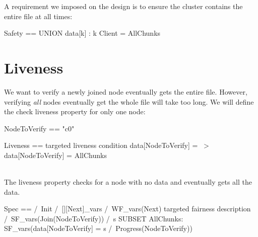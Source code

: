 A requirement we imposed on the design is to ensure the cluster contains the
entire file at all times:\\

\begin{tla}
Safety == 
    UNION {data[k] : k \in Client} = AllChunks
\end{tla}
\begin{tlatex}
%
\end{tlatex}

\section{Liveness}

We want to verify a newly joined node eventually gets the entire file. However, 
verifying \textit{all} nodes eventually get the whole file will take too long.
We will define the check liveness property for only one node:\\

\begin{tla}
NodeToVerify == "c0"

Liveness == 
    \* targeted liveness condition
    data[NodeToVerify] = {} ~> data[NodeToVerify] = AllChunks
\end{tla}
\begin{tlatex}
%
\@pvspace{8.0pt}%
%
%
%
\@xx{}%
\end{tlatex}
\\

The liveness property checks for a node with no data and eventually gets all the
data.\\

\begin{tla}
Spec ==
    /\ Init
    /\ [][Next]_vars
    /\ WF_vars(Next)
    \* targeted fairness description
    /\ SF_vars(Join(NodeToVerify))
    /\ \A s \in SUBSET AllChunks: 
        SF_vars(data[NodeToVerify] = s /\ Progress(NodeToVerify))   
\end{tla}
\begin{tlatex}
%
%
%
%
%
%
\@xx{}%
%
%
\end{tlatex}
\\

